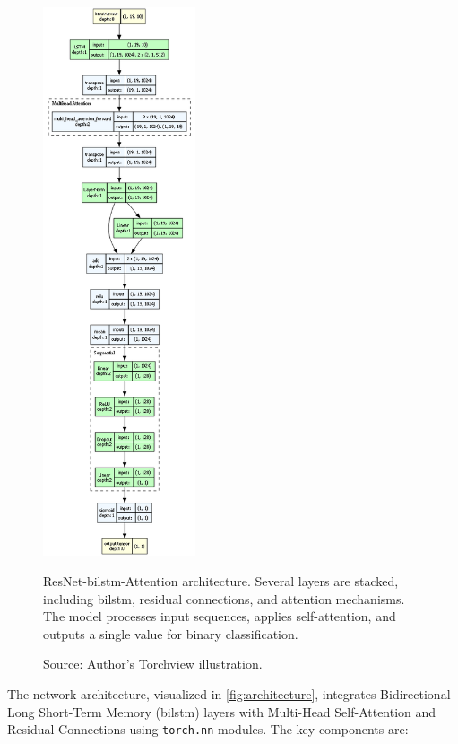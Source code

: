 \begin{figure}[htbp]
  \centering
  \includegraphics[width=0.4\textwidth]{figures/architecture.png}
  \caption[ResNet-BiLSTM-Attention Architecture]{ResNet-\gls{bilstm}-Attention architecture. Several layers are stacked, including \gls{bilstm}, residual connections, and attention mechanisms. The model processes input sequences, applies self-attention, and outputs a single value for binary classification.}
  \label{fig:architecture}
  \caption*{Source: Author's Torchview illustration.}
\end{figure}

The network architecture, visualized in \autoref{fig:architecture}, integrates Bidirectional Long Short-Term Memory (\gls{bilstm}) layers with Multi-Head Self-Attention and Residual Connections using \texttt{torch.nn} modules. The key components are:

